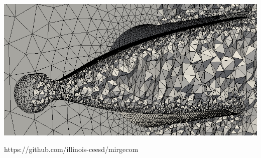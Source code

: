 \begin{frame}
  \hfill
  \begin{minipage}{0.34\textwidth}
     \includegraphics[width=\textwidth]{Figures/nozzle-mesh.png}
     \par\noindent
     \vspace*{25pt}
     \phantom{\rule{\textwidth}{0.5pt}} %
  \end{minipage}
\vspace{-15pt}
\begin{center}
https://github.com/illinois-ceesd/mirgecom
\end{center}
\end{frame}


